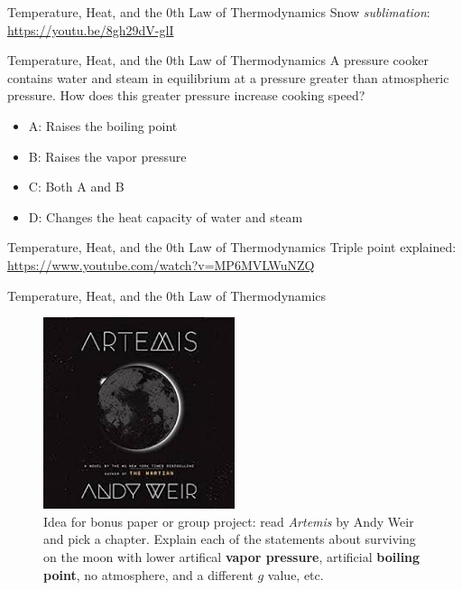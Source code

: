 \documentclass{beamer}
\begin{document}
\begin{frame}{Temperature, Heat, and the 0th Law of Thermodynamics}
Snow \textit{sublimation}: \\ \vspace{0.5cm}
\url{https://youtu.be/8gh29dV-glI}
\end{frame}

\begin{frame}{Temperature, Heat, and the 0th Law of Thermodynamics}
A pressure cooker contains water and steam in equilibrium at a pressure greater than atmospheric pressure.  How does this greater pressure increase cooking speed?
\begin{itemize}
\item A: Raises the boiling point
\item B: Raises the vapor pressure
\item C: Both A and B
\item D: Changes the heat capacity of water and steam
\end{itemize}
\end{frame}

\begin{frame}{Temperature, Heat, and the 0th Law of Thermodynamics}
Triple point explained: \\ \url{https://www.youtube.com/watch?v=MP6MVLWuNZQ}
\end{frame}

\begin{frame}{Temperature, Heat, and the 0th Law of Thermodynamics}
\begin{figure}
\centering
\includegraphics[width=0.5\textwidth]{figures/artemis.jpg}
\caption{\label{fig:artemis} Idea for bonus paper or group project: read \textit{Artemis} by Andy Weir and pick a chapter.  Explain each of the statements about surviving on the moon with lower artifical \textbf{vapor pressure}, artificial \textbf{boiling point}, no atmosphere, and a different $g$ value, etc.}
\end{figure}
\end{frame}
\end{document}

